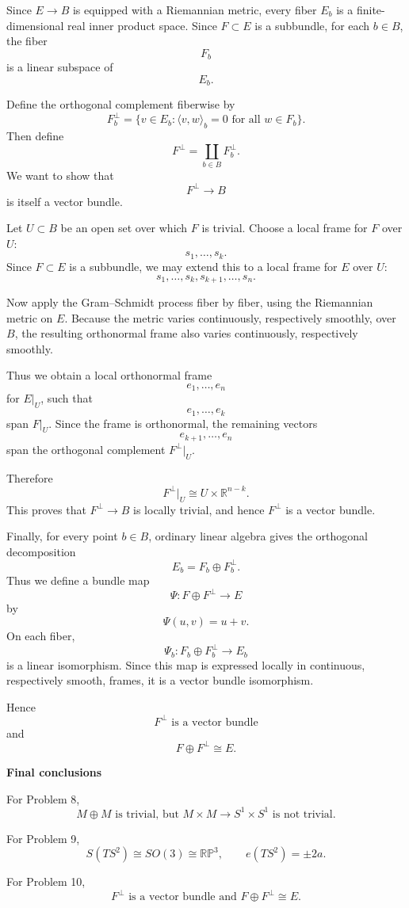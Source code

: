 \begin{solution}
Since \(E\to B\) is equipped with a Riemannian metric, every fiber \(E_{b}\) is a finite-dimensional real inner product space. Since \(F\subset E\) is a subbundle, for each \(b\in B\), the fiber
	\[
	F_{b}
	\]
	is a linear subspace of
	\[
	E_{b}.
	\]

	Define the orthogonal complement fiberwise by
	\[
	F_{b}^{\perp}
	=
	\{v\in E_{b}:\langle v,w\rangle_{b}=0
	\text{ for all }w\in F_{b}\}.
	\]
	Then define
	\[
	F^{\perp}
	=
	\coprod_{b\in B}F_{b}^{\perp}.
	\]
	We want to show that
	\[
	F^{\perp}\to B
	\]
	is itself a vector bundle.

	Let \(U\subset B\) be an open set over which \(F\) is trivial. Choose a local frame for \(F\) over \(U\):
	\[
	s_{1},\dots,s_{k}.
	\]
	Since \(F\subset E\) is a subbundle, we may extend this to a local frame for \(E\) over \(U\):
	\[
	s_{1},\dots,s_{k},s_{k+1},\dots,s_{n}.
	\]

	Now apply the Gram--Schmidt process fiber by fiber, using the Riemannian metric on \(E\). Because the metric varies continuously, respectively smoothly, over \(B\), the resulting orthonormal frame also varies continuously, respectively smoothly.

	Thus we obtain a local orthonormal frame
	\[
	e_{1},\dots,e_{n}
	\]
	for \(E|_{U}\), such that
	\[
	e_{1},\dots,e_{k}
	\]
	span \(F|_{U}\). Since the frame is orthonormal, the remaining vectors
	\[
	e_{k+1},\dots,e_{n}
	\]
	span the orthogonal complement \(F^{\perp}|_{U}\).

	Therefore
	\[
	F^{\perp}|_{U}\cong U\times \mathbb R^{n-k}.
	\]
	This proves that \(F^{\perp}\to B\) is locally trivial, and hence \(F^{\perp}\) is a vector bundle.

	Finally, for every point \(b\in B\), ordinary linear algebra gives the orthogonal decomposition
	\[
	E_{b}=F_{b}\oplus F_{b}^{\perp}.
	\]
	Thus we define a bundle map
	\[
	\Psi:F\oplus F^{\perp}\to E
	\]
	by
	\[
	\Psi(u,v)=u+v.
	\]
	On each fiber,
	\[
	\Psi_{b}:F_{b}\oplus F_{b}^{\perp}\to E_{b}
	\]
	is a linear isomorphism. Since this map is expressed locally in continuous, respectively smooth, frames, it is a vector bundle isomorphism.

	Hence
	\[
	\boxed{F^{\perp}\text{ is a vector bundle}}
	\]
	and
	\[
	\boxed{F\oplus F^{\perp}\cong E.}
	\]

	
\medskip
\noindent\textbf{Final conclusions}\par
\smallskip


	For Problem 8,
	\[
	\boxed{M\oplus M\text{ is trivial, but }M\times M\to S^{1}\times S^{1}\text{ is not trivial}.}
	\]

	For Problem 9,
	\[
	\boxed{S(TS^{2})\cong SO(3)\cong \mathbb{RP}^{3},\qquad e(TS^{2})=\pm 2a.}
	\]

	For Problem 10,
	\[
	\boxed{F^{\perp}\text{ is a vector bundle and }F\oplus F^{\perp}\cong E.}
	\]
\end{solution}

